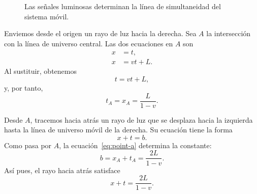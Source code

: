 \begin{figure}[H]\centering
{}\caption{Las señales luminosas determinan la línea de simultaneidad del sistema móvil.}\end{figure}

Enviemos desde el origen un rayo de luz hacia la derecha. Sea \(A\) la intersección con la línea de universo central. Las dos ecuaciones en \(A\) son
\begin{align}
x&=t,\\
x&=vt+L.
\end{align}
Al sustituir, obtenemos
\begin{equation}
t=vt+L,
\end{equation}
y, por tanto,
\begin{equation}
t_A=x_A=\frac{L}{1-v}.
\label{eq:point-a}
\end{equation}

Desde \(A\), tracemos hacia atrás un rayo de luz que se desplaza hacia la izquierda hasta la línea de universo móvil de la derecha. Su ecuación tiene la forma
\begin{equation}
x+t=b.
\end{equation}
Como pasa por \(A\), la ecuación~\eqref{eq:point-a} determina la constante:
\begin{equation}
b=x_A+t_A=\frac{2L}{1-v}.
\end{equation}
Así pues, el rayo hacia atrás satisface
\begin{equation}
x+t=\frac{2L}{1-v}.
\label{eq:backward-ray}
\end{equation}

